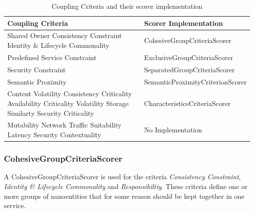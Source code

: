 \begin{table}[H]
	\centering
	\caption{Coupling Criteria and their scorer implementation}
	\label{tab:scorer}
	\begin{tabular}{|p{170pt}|p{200pt}|}
		\hline	
		\textbf{Coupling Criteria} & \textbf{Scorer Implementation}  \\
		\hline
		Shared Owner \newline Consistency Constraint \newline Identity \& Lifecycle Commonality  & CohesiveGroupCriteriaScorer \\
		\hline
		Predefined Service Constraint  & ExclusiveGroupCriteriaScorer \\ 
		\hline
		Security Constraint & SeparatedGroupCriteriaScorer \\
		\hline
		Semantic Proximity & SemanticProximityCriterionScorer \\
		\hline
		Content Volatility \newline Consistency Criticality \newline Availability Criticality \newline Volatility \newline Storage Similarty \newline Security Criticality & CharacteristicsCriteriaScorer  \\
		\hline
		Mutability \newline Network Traffic Suitability \newline Latency \newline Security Contextuality & No Implementation  \\
		\hline
	\end{tabular}
\end{table}



\subsubsection{CohesiveGroupCriteriaScorer}

A CohesiveGroupCriteriaScorer is used for the criteria \textit{Consistency Constraint}, \textit{Identity \& Lifecycle Commonality} and \textit{Responsibiltiy}. These criteria define one or more groups of nanoentities that for some reason should be kept together in one service.

